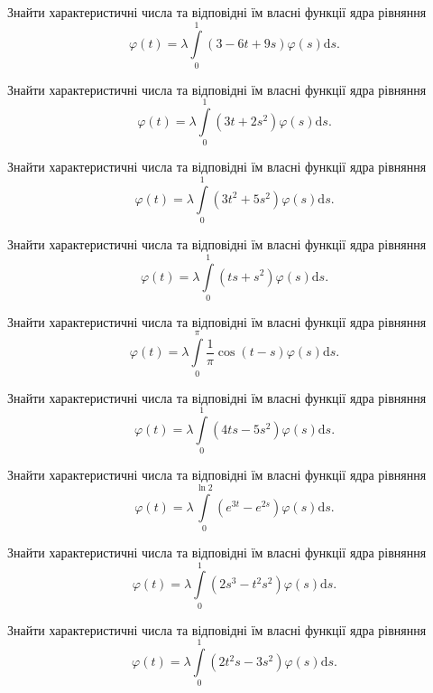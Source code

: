 \documentclass[12pt]{extarticle}
\begin{document}
\begin{Exercise}
Знайти характеристичні числа та відповідні їм власні функції ядра рівняння \[\varphi(t) = \lambda\int\limits_{0}^{1} (3-6t+9s) \varphi(s) \mathrm{d}s.\]
\end{Exercise}

\begin{Exercise}
Знайти характеристичні числа та відповідні їм власні функції ядра рівняння \[\varphi(t) = \lambda\int\limits_{0}^{1} (3t+2s^2) \varphi(s) \mathrm{d}s.\]
\end{Exercise}

\begin{Exercise}
Знайти характеристичні числа та відповідні їм власні функції ядра рівняння \[\varphi(t) = \lambda\int\limits_{0}^{1} (3t^2+5s^2) \varphi(s) \mathrm{d}s.\]
\end{Exercise}

\begin{Exercise}
Знайти характеристичні числа та відповідні їм власні функції ядра рівняння \[\varphi(t) = \lambda\int\limits_{0}^{1} (ts+s^2) \varphi(s) \mathrm{d}s.\]
\end{Exercise}

\begin{Exercise}
Знайти характеристичні числа та відповідні їм власні функції ядра рівняння \[\varphi(t) = \lambda\int\limits_{0}^{\pi} \dfrac{1}{\pi} \cos(t-s) \varphi(s) \mathrm{d}s.\]
\end{Exercise}

\begin{Exercise}
Знайти характеристичні числа та відповідні їм власні функції ядра рівняння \[\varphi(t) = \lambda\int\limits_{0}^{1} (4ts - 5s^2) \varphi(s) \mathrm{d}s.\]
\end{Exercise}

\begin{Exercise}
Знайти характеристичні числа та відповідні їм власні функції ядра рівняння \[\varphi(t) = \lambda\int\limits_{0}^{\ln 2} (e^{3t} - e^{2s}) \varphi(s) \mathrm{d}s.\]
\end{Exercise}

\begin{Exercise}
Знайти характеристичні числа та відповідні їм власні функції ядра рівняння \[\varphi(t) = \lambda\int\limits_{0}^{1} (2s^3 - t^2 s^2) \varphi(s) \mathrm{d}s.\]
\end{Exercise}

\begin{Exercise}
Знайти характеристичні числа та відповідні їм власні функції ядра рівняння \[\varphi(t) = \lambda\int\limits_{0}^{1} (2t^2 s - 3s^2) \varphi(s) \mathrm{d}s.\]
\end{Exercise}
\end{document}
